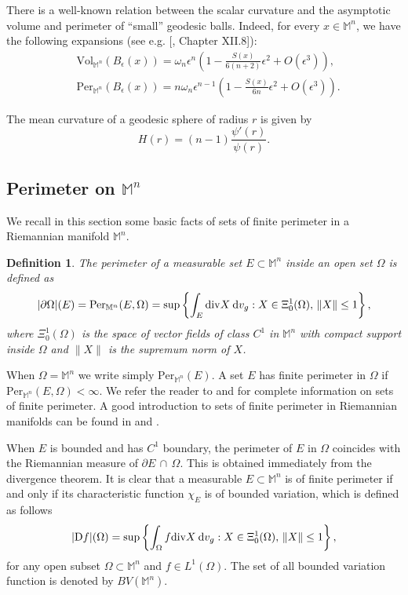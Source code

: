 \documentclass[a4paper,11pt,reqno]{amsart}
\theoremstyle{plain}
\newtheorem{definition}{Definition}[section]
\numberwithin{equation}{section} \allowdisplaybreaks
\newcommand{\dvg}{\: {\rm d}v_{g}}
\newcommand{\m}{\mathbb{M}^n}
\newcommand{\uv}{\omega_n}
\begin{document}
There is a well-known relation between the scalar curvature and the asymptotic volume and perimeter of “small” geodesic balls. Indeed, for every $x\in \m$, we have the following expansions (see e.g. [\cite{Chavel}, Chapter
XII.8]):
\begin{align*}
    &\text{Vol}_{\m}(B_{\epsilon}(x))= \uv \epsilon^n\left(1-\frac{S(x)}{6(n+2)}\epsilon^2+O(\epsilon^3)\right),\\
    &\text{Per}_{\m}(B_{\epsilon}(x))=n\uv\epsilon^{n-1}\left(1-\frac{S(x)}{6n}\epsilon^2+O(\epsilon^3)\right).
\end{align*}

The mean curvature of a geodesic sphere of radius $r$ is given by
\begin{equation}\label{mean curvature}
    H(r)=(n-1)\frac{\psi'(r)}{\psi(r)}.
\end{equation}

\subsection{Perimeter on \texorpdfstring{$\m$}{M}} We recall in this section some basic facts of sets of finite perimeter in a Riemannian manifold $\m$. 
\begin{definition}\label{perimeter}
    The perimeter of a measurable set $E\subset \m$ inside an open set $\Omega$ is defined as
    \begin{equation*}
        |\partial \Omega|(E)=\mathrm{Per}_{\m}(E,\Omega) =\sup\left\{\int_E \mathrm{div}X\dvg : X \in \Xi_0^1(\Omega),\, \|X\|\leq 1 \right\},
    \end{equation*}
    where $\Xi_0^1(\Omega)$ is the space of vector fields of class $C^1$ in $\m$ with compact support inside $\Omega$ and $\|X\|$ is the supremum norm of $X$.
\end{definition}
When $\Omega=\m$ we write simply $\text{Per}_{\m}(E)$. A set $E$ has finite perimeter in $\Omega$ if $\text{Per}_{\m}(E,\Omega)<\infty$. We refer the reader to \cite{Giusti} and \cite{Maggi} for complete information on sets of finite perimeter. A good introduction to sets of finite perimeter in Riemannian manifolds can be found in \cite[section 1]{MPPP} and \cite[chapter 1]{Ritore}.

When $E$ is bounded and has $C^1$ boundary, the perimeter of $E$ in $\Omega$ coincides with the Riemannian measure of $\partial E \,\cap\,\Omega $. This is obtained immediately from the divergence theorem. It is clear that a measurable $E\subset \m$ is of finite perimeter if and only if its characteristic function $\chi_E$ is of bounded variation, which is defined as follows
\begin{equation*}
    |\mathrm{D}f|(\Omega)=\sup\left\{\int_{\Omega} f\text{div}X\dvg : X \in \Xi_0^1(\Omega),\, \|X\|\leq 1 \right\},
\end{equation*}
for any open subset $\Omega\subset \m$ and $f\in L^1(\Omega)$.
The set of all bounded variation function is denoted by $BV(\m)$.
\medskip
\end{document}
